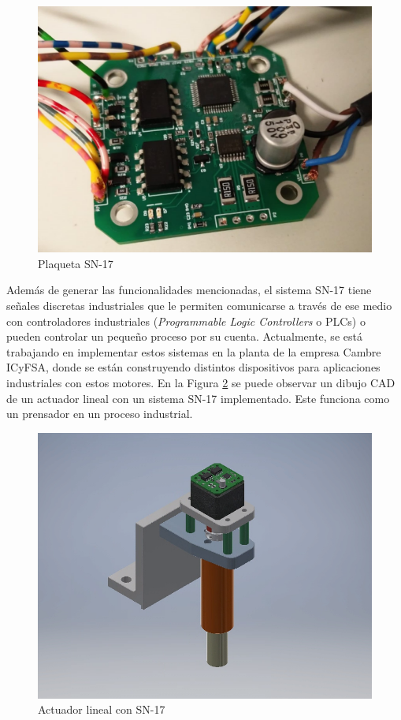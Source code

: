 \begin{figure}[htbp]
	\centering
	\includegraphics[scale=.3]{./Figures/SN17_5.jpeg}
	\caption{Plaqueta SN-17}
	\label{fig:SN17}
\end{figure}

Además de generar las funcionalidades mencionadas, el sistema SN-17 tiene señales discretas industriales que le permiten comunicarse a través de ese medio con controladores industriales (\textit{Programmable Logic Controllers} o PLCs) o pueden controlar un pequeño proceso por su cuenta.
Actualmente, se está trabajando en implementar estos sistemas en la planta de la empresa Cambre ICyFSA, donde se están construyendo distintos dispositivos para aplicaciones industriales con estos motores. En la Figura \ref{fig:aplicacionSN17} se puede observar un dibujo CAD de un actuador lineal con un sistema SN-17 implementado. Este funciona como un prensador en un proceso industrial.

\begin{figure}[htbp]
	\centering
	\includegraphics[scale=.6]{./Figures/Prensador-N17.PNG}
	\caption{Actuador lineal con SN-17}
	\label{fig:aplicacionSN17}
\end{figure}

